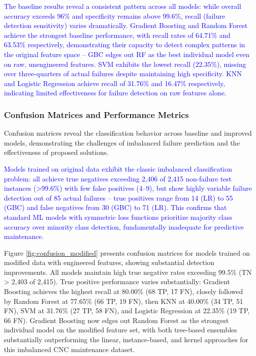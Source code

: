 \documentclass[final,5p, twocolumn]{elsarticle}
\begin{document}
\textcolor{blue}{The baseline results reveal a consistent pattern across all models: while overall accuracy exceeds 96\% and specificity remains above 99.6\%, recall (failure detection sensitivity) varies dramatically. Gradient Boosting and Random Forest achieve the strongest baseline performance, with recall rates of 64.71\% and 63.53\% respectively, demonstrating their capacity to detect complex patterns in the original feature space -- GBC edges out RF as the best individual model even on raw, unengineered features. SVM exhibits the lowest recall (22.35\%), missing over three-quarters of actual failures despite maintaining high specificity. KNN and Logistic Regression achieve recall of 31.76\% and 16.47\% respectively, indicating limited effectiveness for failure detection on raw features alone.}

\subsubsection{Confusion Matrices and Performance Metrics}
Confusion matrices reveal the classification behavior across baseline and improved models, demonstrating the challenges of imbalanced failure prediction and the effectiveness of proposed solutions.

\textcolor{blue}{Models trained on original data exhibit the classic imbalanced classification problem: all achieve true negatives exceeding 2,406 of 2,415 non-failure test instances (>99.6\%) with few false positives (4--9), but show highly variable failure detection out of 85 actual failures -- true positives range from 14 (LR) to 55 (GBC) and false negatives from 30 (GBC) to 71 (LR). This confirms that standard ML models with symmetric loss functions prioritize majority class accuracy over minority class detection, fundamentally inadequate for predictive maintenance.}

Figure \ref{fig:confusion_modified} presents confusion matrices for models trained on modified data with engineered features, showing substantial detection improvements. All models maintain high true negative rates exceeding 99.5\% (TN > 2,403 of 2,415). True positive performance varies substantially: Gradient Boosting achieves the highest recall at 80.00\% (68 TP, 17 FN), closely followed by Random Forest at 77.65\% (66 TP, 19 FN), then KNN at 40.00\% (34 TP, 51 FN), SVM at 31.76\% (27 TP, 58 FN), and Logistic Regression at 22.35\% (19 TP, 66 FN). Gradient Boosting now edges out Random Forest as the strongest individual model on the modified feature set, with both tree-based ensembles substantially outperforming the linear, instance-based, and kernel approaches for this imbalanced CNC maintenance dataset.
\end{document}
